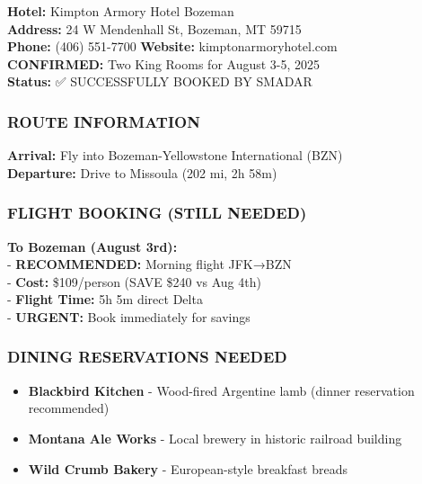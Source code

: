 \documentclass[
  10pt,
]{article}
\providecommand{\tightlist}{%
  \setlength{\itemsep}{0pt}\setlength{\parskip}{0pt}}
\begin{document}
\textbf{\textcolor{secondary}{Hotel:}} Kimpton Armory Hotel Bozeman\\
\textbf{\textcolor{secondary}{Address:}} 24 W Mendenhall St, Bozeman, MT
59715\\
\textbf{\textcolor{secondary}{Phone:}} (406) 551-7700 \textbar{}
\textbf{\textcolor{secondary}{Website:}} kimptonarmoryhotel.com\\
\textbf{\textcolor{primary}{CONFIRMED:}} Two King Rooms for August 3-5,
2025\\
\textbf{\textcolor{primary}{Status:}} ✅ SUCCESSFULLY BOOKED BY SMADAR

\subsubsection{\texorpdfstring{\textcolor{primary}{ROUTE INFORMATION}}{}}\label{section-5}

\textbf{\textcolor{secondary}{Arrival:}} Fly into Bozeman-Yellowstone
International (BZN)\\
\textbf{\textcolor{secondary}{Departure:}} Drive to Missoula (202 mi, 2h
58m)

\subsubsection{\texorpdfstring{\textcolor{primary}{FLIGHT BOOKING (STILL NEEDED)}}{}}\label{section-6}

\textbf{\textcolor{secondary}{To Bozeman (August 3rd):}}\\
- \textbf{RECOMMENDED:} Morning flight JFK→BZN\\
- \textbf{Cost:} \$109/person (SAVE \$240 vs Aug 4th)\\
- \textbf{Flight Time:} 5h 5m direct Delta\\
- \textbf{\textcolor{secondary}{URGENT:}} Book immediately for savings

\subsubsection{\texorpdfstring{\textcolor{primary}{DINING RESERVATIONS NEEDED}}{}}\label{section-7}

\begin{itemize}
\tightlist
\item
  \textbf{\textcolor{secondary}{Blackbird Kitchen}} - Wood-fired
  Argentine lamb (dinner reservation recommended)
\item
  \textbf{\textcolor{secondary}{Montana Ale Works}} - Local brewery in
  historic railroad building
\item
  \textbf{\textcolor{secondary}{Wild Crumb Bakery}} - European-style
  breakfast breads
\end{itemize}
\end{document}
